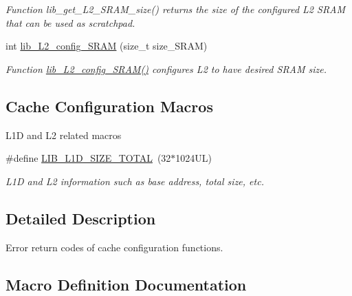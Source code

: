 \begin{DoxyCompactItemize}
\begin{DoxyCompactList}\small\item\em Function lib\+\_\+get\+\_\+\+L2\+\_\+\+S\+R\+A\+M\+\_\+size() returns the size of the configured L2 S\+R\+A\+M that can be used as scratchpad. \end{DoxyCompactList}\item 
int \hyperlink{group__libarch__cachecfg_ga529504ec5196118f6fc9d744b6209d61}{lib\+\_\+\+L2\+\_\+config\+\_\+\+S\+R\+A\+M} (size\+\_\+t size\+\_\+\+S\+R\+A\+M)
\begin{DoxyCompactList}\small\item\em Function \hyperlink{group__libarch__cachecfg_ga529504ec5196118f6fc9d744b6209d61}{lib\+\_\+\+L2\+\_\+config\+\_\+\+S\+R\+A\+M()} configures L2 to have desired S\+R\+A\+M size. \end{DoxyCompactList}\end{DoxyCompactItemize}
\subsection*{Cache Configuration Macros}
\label{_amgrp6560553d0380dadeb320fd46e372825e}%
L1\+D and L2 related macros \begin{DoxyCompactItemize}
\item 
\#define \hyperlink{group__libarch__cachecfg_gaa53b184a257b7a1265603b599f0b3ea2}{L\+I\+B\+\_\+\+L1\+D\+\_\+\+S\+I\+Z\+E\+\_\+\+T\+O\+T\+A\+L}~(32$\ast$1024\+U\+L)
\begin{DoxyCompactList}\small\item\em L1\+D and L2 information such as base address, total size, etc. \end{DoxyCompactList}\end{DoxyCompactItemize}


\subsection{Detailed Description}
Error return codes of cache configuration functions. 



\subsection{Macro Definition Documentation}
\hypertarget{group__libarch__cachecfg_gab447a2c2ef93390a4ae137b80fc575a9}{}
